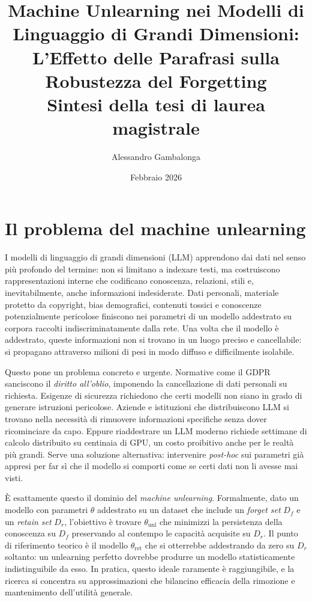 \documentclass[12pt,a4paper]{article}
\title{
  \textbf{Machine Unlearning nei Modelli di Linguaggio di Grandi Dimensioni:}\\[0.3em]
  \textbf{L'Effetto delle Parafrasi sulla Robustezza del Forgetting}\\[0.9em]
  \large Sintesi della tesi di laurea magistrale
}
\author{Alessandro Gambalonga}
\date{Febbraio 2026}
\begin{document}
\maketitle
\thispagestyle{empty}
\vspace{-0.5em}

\section{Il problema del machine unlearning}

I modelli di linguaggio di grandi dimensioni (LLM) apprendono dai dati nel senso più profondo del termine: non si limitano a indexare testi, ma costruiscono rappresentazioni interne che codificano conoscenza, relazioni, stili e, inevitabilmente, anche informazioni indesiderate. Dati personali, materiale protetto da copyright, bias demografici, contenuti tossici e conoscenze potenzialmente pericolose finiscono nei parametri di un modello addestrato su corpora raccolti indiscriminatamente dalla rete. Una volta che il modello è addestrato, queste informazioni non si trovano in un luogo preciso e cancellabile: si propagano attraverso milioni di pesi in modo diffuso e difficilmente isolabile.

Questo pone un problema concreto e urgente. Normative come il GDPR sanciscono il \emph{diritto all'oblio}, imponendo la cancellazione di dati personali su richiesta. Esigenze di sicurezza richiedono che certi modelli non siano in grado di generare istruzioni pericolose. Aziende e istituzioni che distribuiscono LLM si trovano nella necessità di rimuovere informazioni specifiche senza dover ricominciare da capo. Eppure riaddestrare un LLM moderno richiede settimane di calcolo distribuito su centinaia di GPU, un costo proibitivo anche per le realtà più grandi. Serve una soluzione alternativa: intervenire \emph{post-hoc} sui parametri già appresi per far sì che il modello si comporti come se certi dati non li avesse mai visti.

È esattamente questo il dominio del \emph{machine unlearning}. Formalmente, dato un modello con parametri $\theta$ addestrato su un dataset che include un \emph{forget set} $D_f$ e un \emph{retain set} $D_r$, l'obiettivo è trovare $\theta_{\mathrm{unl}}$ che minimizzi la persistenza della conoscenza su $D_f$ preservando al contempo le capacità acquisite su $D_r$. Il punto di riferimento teorico è il modello $\theta_{\mathrm{ret}}$ che si otterrebbe addestrando da zero su $D_r$ soltanto: un unlearning perfetto dovrebbe produrre un modello statisticamente indistinguibile da esso. In pratica, questo ideale raramente è raggiungibile, e la ricerca si concentra su approssimazioni che bilancino efficacia della rimozione e mantenimento dell'utilità generale.
\end{document}
